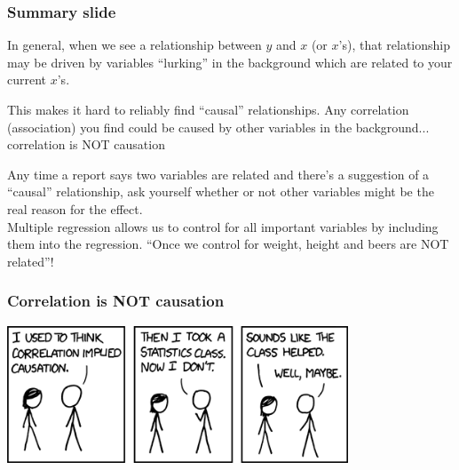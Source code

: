 \documentclass{beamer}
\newcommand{\sk}{\vspace{.5cm}}
\begin{document}
\begin{frame}
\frametitle{Summary slide}

In general, when we see a relationship between $y$ and $x$ (or $x$'s), that relationship may be driven by variables ``lurking'' in the background which are related to your current $x$'s.

\sk
This makes it hard to reliably find {\color{lightblue}``causal''} relationships. Any correlation (association) you find could be caused by other variables in the background... 
{\color{burntorange}correlation is NOT causation}

\sk 
Any time a report says two variables are related and there's a suggestion of a {\color{lightblue}``causal''} relationship, ask yourself whether or not other variables might be the real reason for the effect. \\ \sk Multiple regression allows us to {\color{burntorange}control} for all important variables by including them into the regression. {\color{burntorange}``Once we control for weight, height and beers are NOT related''!} 
\end{frame}


\begin{frame}
\frametitle{Correlation is NOT causation}
\begin{center}
\includegraphics[width=4in]{figures/xkcd.png}
\end{center}
\end{frame}
\end{document}
